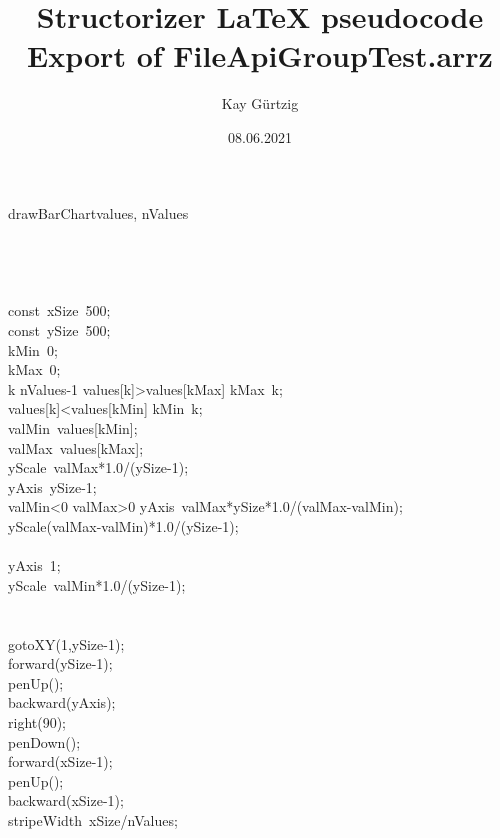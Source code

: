\documentclass[a4paper,10pt]{article}
\title{Structorizer LaTeX pseudocode Export of FileApiGroupTest.arrz}
\author{Kay Gürtzig}
\date{08.06.2021}
\begin{document}
\begin{pseudocode}{drawBarChart}{values, nValues }
\label{drawBarChart}
\\
\\
\\
\\
  \\
  const\ xSize\gets\ 500;\\
  const\ ySize\gets\ 500;\\
  kMin\gets\ 0;\\
  kMax\gets\ 0;\\
  \FOR k  \TO nValues-1  \DO
    \IF values[k]>values[kMax] \THEN
      kMax\gets\ k;\\
    \ELSE
      \IF values[k]<values[kMin] \THEN
        kMin\gets\ k;\\
  valMin\gets\ values[kMin];\\
  valMax\gets\ values[kMax];\\
  yScale\gets\ valMax*1.0/(ySize-1);\\
  yAxis\gets\ ySize-1;\\
  \IF valMin<0 \THEN
    \IF valMax>0 \THEN
    \BEGIN
      yAxis\gets\ valMax*ySize*1.0/(valMax-valMin);\\
      yScale\gets(valMax-valMin)*1.0/(ySize-1);\\
    \END\\
    \ELSE
    \BEGIN
      yAxis\gets\ 1;\\
      yScale\gets\ valMin*1.0/(ySize-1);\\
    \END\\
  \\
  gotoXY(1,ySize-1);\\
  forward(ySize-1);\\
  penUp();\\
  backward(yAxis);\\
  right(90);\\
  penDown();\\
  forward(xSize-1);\\
  penUp();\\
  backward(xSize-1);\\
  stripeWidth\gets\ xSize/nValues;\\

\end{pseudocode}
\end{document}

